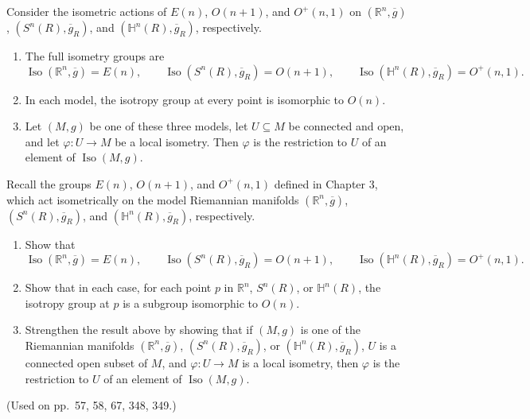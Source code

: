 \begin{proposition}
\label{prop:model-manifolds-isometric-actions}

Consider the isometric actions of $E(n)$, $O(n+1)$, and $O^+(n,1)$ on
$(\mathbb R^n,\overline g)$, $(S^n(R),\overline g_R)$, and
$(\mathbb H^n(R),\overline g_R)$, respectively.
\begin{enumerate}
\item[(a)] The full isometry groups are
\[
\operatorname{Iso}(\mathbb R^n,\overline g)=E(n),\qquad
\operatorname{Iso}(S^n(R),\overline g_R)=O(n+1),\qquad
\operatorname{Iso}(\mathbb H^n(R),\overline g_R)=O^+(n,1).
\]
\item[(b)] In each model, the isotropy group at every point is
isomorphic to $O(n)$.
\item[(c)] Let $(M,g)$ be one of these three models, let $U\subseteq M$ be
connected and open, and let $\varphi:U\to M$ be a local isometry. Then
$\varphi$ is the restriction to $U$ of an element of
$\operatorname{Iso}(M,g)$.
\end{enumerate}
\end{proposition}

\begin{exercise}
\label{prob:model-manifolds-isometric-actions}

Recall the groups $E(n)$, $O(n+1)$, and $O^+(n,1)$ defined in Chapter 3, which act isometrically on the model Riemannian manifolds $(\mathbb{R}^n, \overline{g})$, $(S^n(R), \overline{g}_R)$, and $(\mathbb{H}^n(R), \overline{g}_R)$, respectively.
\begin{enumerate}
\item[(a)] Show that
\[
\operatorname{Iso}(\mathbb{R}^n,\overline{g}) = E(n), \qquad
\operatorname{Iso}(S^n(R),\overline{g}_R) = O(n+1), \qquad
\operatorname{Iso}(\mathbb{H}^n(R),\overline{g}_R) = O^+(n,1).
\]
\item[(b)] Show that in each case, for each point $p$ in $\mathbb{R}^n$, $S^n(R)$, or $\mathbb{H}^n(R)$, the isotropy group at $p$ is a subgroup isomorphic to $O(n)$.
\item[(c)] Strengthen the result above by showing that if $(M,g)$ is one of the Riemannian manifolds $(\mathbb{R}^n,\overline{g})$, $(S^n(R),\overline{g}_R)$, or $(\mathbb{H}^n(R),\overline{g}_R)$, $U$ is a connected open subset of $M$, and $\varphi: U \to M$ is a local isometry, then $\varphi$ is the restriction to $U$ of an element of $\operatorname{Iso}(M,g)$.
\end{enumerate}
(Used on pp.\ 57, 58, 67, 348, 349.)
\end{exercise}


